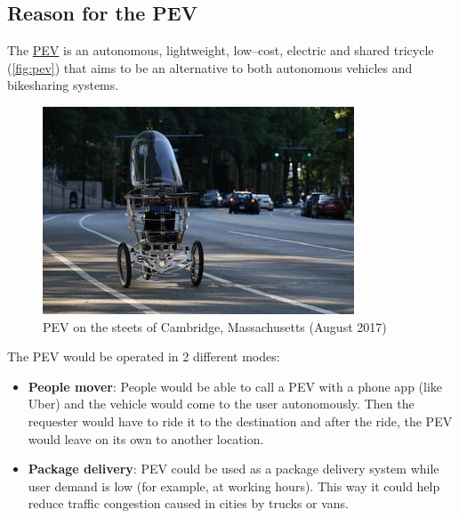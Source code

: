 \subsection{Reason for the PEV}

The \href{https://www.media.mit.edu/projects/pev/overview/}{PEV} is an autonomous, lightweight, low--cost, electric and shared tricycle (\autoref{fig:pev}) that aims to be an alternative to both autonomous vehicles and bikesharing systems.

\begin{figure}[htb]
  \centering
  \includegraphics[width=\linewidth]{pictures/01/pev}
  \caption[PEV on the streets]{PEV on the steets of Cambridge, Massachusetts (August 2017)}
  \label{fig:pev}
\end{figure}

The PEV would be operated in 2 different modes:

\begin{itemize}

  \item \textbf{People mover}: People would be able to call a PEV with a phone app (like Uber) and the vehicle would come to the user autonomously. Then the requester would have to ride it to the destination and after the ride, the PEV would leave on its own to another location.

  \item \textbf{Package delivery}: PEV could be used as a package delivery system while user demand is low (for example, at working hours). This way it could help reduce traffic congestion caused in cities by trucks or vans.

\end{itemize}  

